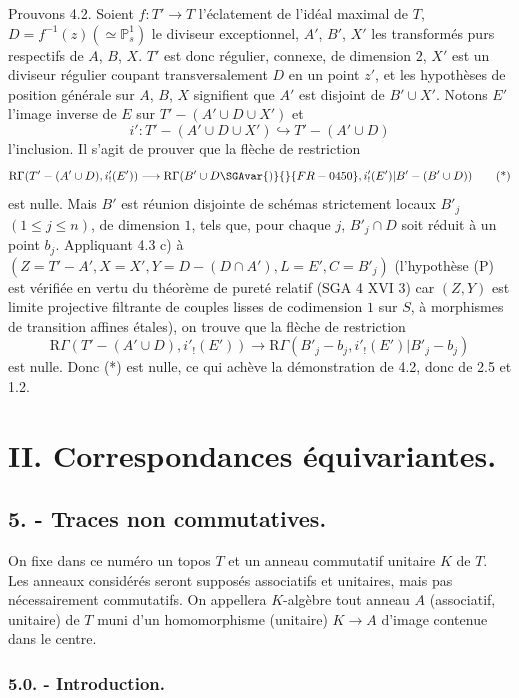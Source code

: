 Prouvons 4.2. Soient $f:T'\to T$ l'éclatement de l'idéal
maximal de $T$, $D=f^{-1}(z)(\simeq\mathbb{P}^1_s)$ le diviseur exceptionnel, $A'$, $B'$, $X'$ les transformés purs respectifs de $A$, $B$, $X$. $T'$ est donc régulier, connexe, de dimension $2$, $X'$ est un diviseur régulier coupant transversalement $D$ en un point $z'$, et les hypothèses de position générale sur $A$, $B$, $X$ signifient que $A'$ est disjoint de 
$B'\cup X'$. Notons $E'$ l'image inverse de $E$ sur $T'-(A'\cup D\cup X')$ et
\[
i':T'-(A'\cup D\cup X')\hookrightarrow T'-(A'\cup D)
\]
l'inclusion. Il s'agit de prouver que la flèche de restriction
\begin{equation}
\mathrm{R}\Gamma(T'-(A'\cup D),i'_!(E'))
\longrightarrow
\mathrm{R}\Gamma(B'\cup D\SGAvar{)}{}{FR-0450},i'_!(E')|B'-(B'\cup D))
\tag{*}
\end{equation}
est nulle. Mais $B'$ est réunion disjointe de schémas strictement locaux $B'_j$ $(1\le j\le n)$, de dimension $1$, tels que, pour chaque $j$, $B'_j\cap D$ soit réduit à un point $b_j$. Appliquant 4.3 c) à $(Z=T'-A', X=X', Y=D-(D\cap A'), L=E', C=B'_j)$ (l'hypothèse (P) est vérifiée en vertu du théorème de pureté relatif (SGA 4 XVI 3) car $(Z,Y)$ est limite projective filtrante de couples lisses de codimension $1$ sur $S$, à morphismes de transition affines étales), on trouve que la flèche de restriction
\[
\mathrm{R}\Gamma(T'-(A'\cup D),i'_!(E'))
\longrightarrow
\mathrm{R}\Gamma(B'_j-b_j,i'_!(E')|B'_j-b_j)
\]
est nulle. Donc (*) est nulle, ce qui achève la démonstration de 4.2, donc de 2.5 et 1.2.

\section*{II. Correspondances équivariantes.}

\subsection*{5. - Traces non commutatives.}

On fixe dans ce numéro un topos $T$ et un anneau commutatif unitaire $K$ de $T$. Les anneaux considérés seront supposés associatifs et unitaires, mais pas nécessairement commutatifs. On appellera $K$-algèbre tout anneau $A$ (associatif, unitaire) de $T$ muni d'un homomorphisme (unitaire) $K\to A$ d'image contenue dans le centre.

\subsubsection*{5.0. - Introduction.}

